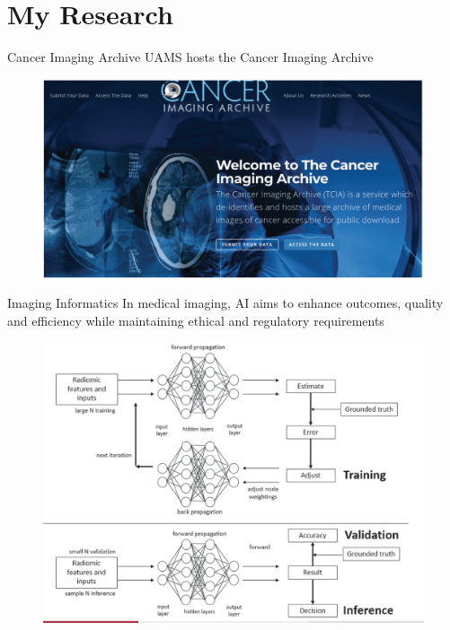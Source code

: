 \documentclass[11pt, aspectratio=43]{beamer}
\begin{document}
\section{My Research}	

\begin{frame}{Cancer Imaging Archive}
	UAMS hosts the Cancer Imaging Archive
	\begin{figure}[h]
		\centering
		\includegraphics[scale=0.45]{Figures/TCIA.png}
	\end{figure}
	
\end{frame}

\begin{frame}{Imaging Informatics}
	In medical imaging, AI aims to enhance outcomes, quality and efficiency
	while maintaining ethical and regulatory requirements
	
	\begin{figure}[h]
		\centering
		\includegraphics[scale=0.45]{Figures/imaging_informatics.png}
	\end{figure}
	
\end{frame}
\end{document}
